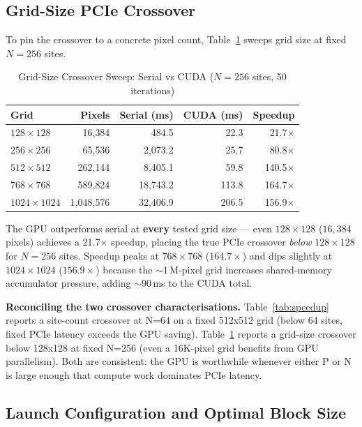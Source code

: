 \documentclass[12pt,a4paper]{article}
\begin{document}
\subsection{Grid-Size PCIe Crossover}

To pin the crossover to a concrete pixel count, Table~\ref{tab:crossover} sweeps
grid size at fixed $N=256$ sites.

\begin{table}[h!]
\centering
\caption{Grid-Size Crossover Sweep: Serial vs CUDA ($N=256$ sites, 50 iterations)}
\label{tab:crossover}
\begin{tabular}{|l|r|r|r|r|}
\toprule
\textbf{Grid} & \textbf{Pixels} & \textbf{Serial (ms)} & \textbf{CUDA (ms)} & \textbf{Speedup} \\
\midrule
$128\times128$    & 16{,}384       & 484.5      & 22.3   & 21.7$\times$   \\
$256\times256$    & 65{,}536       & 2{,}073.2  & 25.7   & 80.8$\times$   \\
$512\times512$    & 262{,}144      & 8{,}405.1  & 59.8   & 140.5$\times$  \\
$768\times768$    & 589{,}824      & 18{,}743.2 & 113.8  & 164.7$\times$  \\
$1024\times1024$  & 1{,}048{,}576  & 32{,}406.9 & 206.5  & 156.9$\times$  \\
\bottomrule
\end{tabular}
\end{table}

\noindent The GPU outperforms serial at \textbf{every} tested grid size --- even
$128\times128$ ($16{,}384$ pixels) achieves a 21.7$\times$ speedup, placing the
true PCIe crossover \emph{below} $128\times128$ for $N=256$ sites.  Speedup
peaks at $768\times768$ ($164.7\times$) and dips slightly at $1024\times1024$
($156.9\times$) because the $\sim$1\,M-pixel grid increases shared-memory
accumulator pressure, adding $\sim$90\,ms to the CUDA total.

\noindent\textbf{Reconciling the two crossover characterisations.}
Table~\ref{tab:speedup} reports a site-count crossover at N=64 on a fixed
512x512 grid (below 64 sites, fixed PCIe latency exceeds the GPU saving).
Table~\ref{tab:crossover} reports a grid-size crossover below 128x128 at
fixed N=256 (even a 16K-pixel grid benefits from GPU parallelism).
Both are consistent: the GPU is worthwhile whenever either P or N is
large enough that compute work dominates PCIe latency.


\subsection{Launch Configuration and Optimal Block Size}
\end{document}
